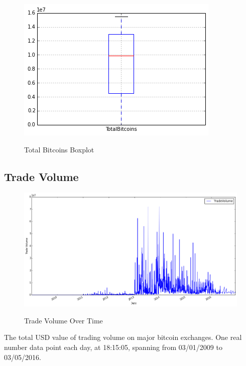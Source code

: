 \begin{figure}[bth]
  \myfloatalign
  {\includegraphics[width=1\linewidth]
    {gfx/total-bitcoins-boxplot}}
  \caption{Total Bitcoins
    Boxplot}
  \label{fig:total-bitcoins-boxplot}
\end{figure}

\clearpage

\subsection{Trade Volume}
\label{sec:trade-volume}

\begin{figure}[bth]
  \myfloatalign
  {\includegraphics[width=1\linewidth]
    {gfx/trade-volume-over-time}}
  \caption{Trade Volume
    Over Time}
  \label{fig:trade-volume-over-time}
\end{figure}

The total USD value of trading volume on major bitcoin exchanges. One
real number data point each day, at 18:15:05, spanning from 03/01/2009
to 03/05/2016.

